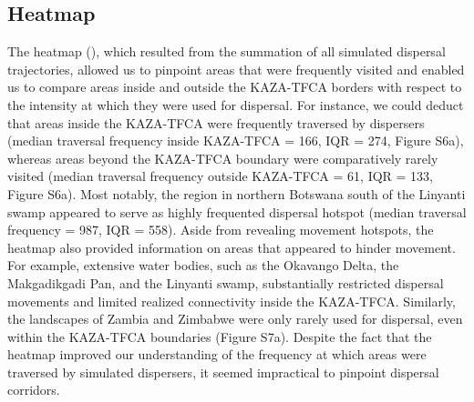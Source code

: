\documentclass[abstract=on,10pt,a4paper,bibliography=totocnumbered]{article}
\begin{document}
\subsection{Heatmap}
The heatmap (), which resulted from the summation of all simulated
dispersal trajectories, allowed us to pinpoint areas that were frequently
visited and enabled us to compare areas inside and outside the KAZA-TFCA borders
with respect to the intensity at which they were used for dispersal. For
instance, we could deduct that areas inside the KAZA-TFCA were frequently
traversed by dispersers (median traversal frequency inside KAZA-TFCA = 166, IQR
= 274, Figure S6a), whereas areas beyond the KAZA-TFCA boundary were
comparatively rarely visited (median traversal frequency outside KAZA-TFCA = 61,
IQR = 133, Figure S6a). Most notably, the region in northern Botswana south of
the Linyanti swamp appeared to serve as highly frequented dispersal hotspot
(median traversal frequency = 987, IQR = 558). Aside from revealing movement
hotspots, the heatmap also provided information on areas that appeared to hinder
movement. For example, extensive water bodies, such as the Okavango Delta, the
Makgadikgadi Pan, and the Linyanti swamp, substantially restricted dispersal
movements and limited realized connectivity inside the KAZA-TFCA. Similarly, the
landscapes of Zambia and Zimbabwe were only rarely used for dispersal, even
within the KAZA-TFCA boundaries (Figure S7a). Despite the fact that the heatmap
improved our understanding of the frequency at which areas were traversed by
simulated dispersers, it seemed impractical to pinpoint dispersal corridors.
\end{document}
